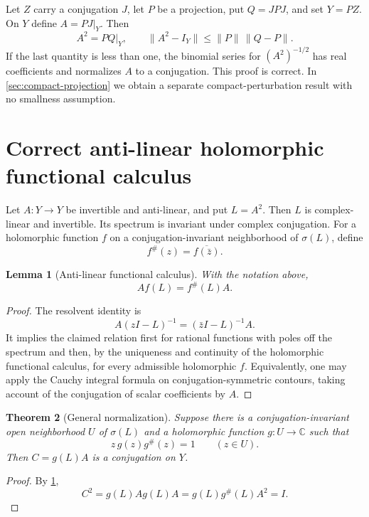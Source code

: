 \documentclass[11pt]{article}
\newtheorem{theorem}{Theorem}[section]
\newtheorem{lemma}[theorem]{Lemma}
\theoremstyle{definition}
\theoremstyle{remark}
\newcommand{\C}{\mathbb C}
\newcommand{\spec}{\sigma}
\begin{document}
Let $Z$ carry a conjugation $J$, let $P$ be a projection, put $Q=JPJ$, and set $Y=PZ$. On $Y$ define $A=PJ|_Y$. Then
\[
 A^2=PQ|_Y,
 \qquad
 \|A^2-I_Y\|\leq \|P\|\,\|Q-P\|.
\]
If the last quantity is less than one, the binomial series for $(A^2)^{-1/2}$ has real coefficients and normalizes $A$ to a conjugation. This proof is correct. In \cref{sec:compact-projection} we obtain a separate compact-perturbation result with no smallness assumption.

\section{Correct anti-linear holomorphic functional calculus}\label{sec:functional-calculus}

Let $A:Y\to Y$ be invertible and anti-linear, and put $L=A^2$. Then $L$ is complex-linear and invertible. Its spectrum is invariant under complex conjugation. For a holomorphic function $f$ on a conjugation-invariant neighborhood of $\spec(L)$, define
\[
       f^{\#}(z)=\overline{f(\bar z)}.
\]

\begin{lemma}[Anti-linear functional calculus]\label{lem:sharp-calculus}
With the notation above,
\[
       A f(L)=f^{\#}(L)A.
\]
\end{lemma}

\begin{proof}
The resolvent identity is
\[
 A(zI-L)^{-1}=(\bar zI-L)^{-1}A.
\]
It implies the claimed relation first for rational functions with poles off the spectrum and then, by the uniqueness and continuity of the holomorphic functional calculus, for every admissible holomorphic $f$. Equivalently, one may apply the Cauchy integral formula on conjugation-symmetric contours, taking account of the conjugation of scalar coefficients by $A$.
\end{proof}

\begin{theorem}[General normalization]\label{thm:general-normalization}
Suppose there is a conjugation-invariant open neighborhood $U$ of $\spec(L)$ and a holomorphic function $g:U\to\C$ such that
\[
       z\,g(z)g^{\#}(z)=1
       \qquad (z\in U).
\]
Then $C=g(L)A$ is a conjugation on $Y$.
\end{theorem}

\begin{proof}
By \cref{lem:sharp-calculus},
\[
 C^2=g(L)A g(L)A
     =g(L)g^{\#}(L)A^2
     =I.
\]
\end{proof}
\end{document}
